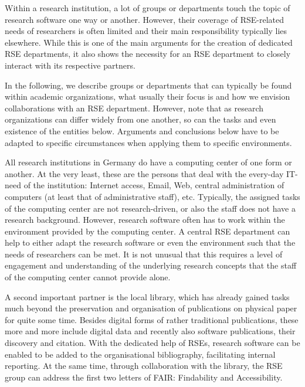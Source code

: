 \documentclass[a4paper]{article}
\begin{document}
Within a research institution, a lot of groups or departments touch the topic of research software one way or another.
However, their coverage of RSE-related needs of researchers is often limited and their main responsibility typically lies elsewhere.
While this is one of the main arguments for the creation of dedicated RSE departments, it also shows the necessity for an RSE department to closely interact with its respective partners.

In the following, we describe groups or departments that can typically be found within academic organizations,
what usually their focus is and how we envision collaborations with an RSE department.
However, note that as research organizations can differ widely from one another, so can the tasks and even existence of the entities below.
Arguments and conclusions below have to be adapted to specific circumstances when applying them to specific environments.

All research institutions in Germany do have a computing center of one form or another.
At the very least, these are the persons that deal with the every-day IT-need of the institution:
Internet access, Email, Web, central administration of computers (at least that of administrative staff), etc.
Typically, the assigned tasks of the computing center are not research-driven, or also the staff does not have a research background.
However, research software often has to work within the environment provided by the computing center.
A central RSE department can help to either adapt the research software or even the environment such that the needs of researchers can be met.
It is not unusual that this requires a level of engagement and understanding of the underlying research concepts that the staff of the computing center cannot provide alone.

A second important partner is the local library, which has already gained tasks much beyond the preservation and organisation of publications on physical paper for quite some time.
Besides digital forms of rather traditional publications, these more and more include digital data and recently also software publications, their discovery and citation.
With the dedicated help of RSEs, research software can be enabled to be added to the organisational bibliography, facilitating internal reporting.
At the same time, through collaboration with the library, the RSE group can address the first two letters of FAIR: Findability and Accessibility.
\end{document}
